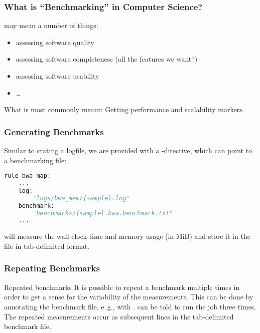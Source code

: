 \begin{frame}
  \frametitle{What is ``Benchmarking'' in Computer Science?}
   may mean a number of things:
  \begin{itemize}[<+->]
   \item assessing software quality
   \item assessing software completeness (all the features we want?)
   \item assessing software usability
   \item \ldots
  \end{itemize}
  \pause
  \begin{docs}
  	What is most commonly meant: Getting performance and scalability markers.
  \end{docs}
\end{frame}

\begin{frame}[fragile]
  \frametitle{Generating Benchmarks}
  Similar to crating a logfile, we are provided with a -directive, which can point to a benchmarking file:
  \begin{lstlisting}[language=Python,style=Python]
rule bwa_map:
    ...
    log:
        "logs/bwa_mem/{sample}.log"
    benchmark:
        "benchmarks/{sample}.bwa.benchmark.txt"
    ...
  \end{lstlisting} 
  \begin{docs}
  	\Snakemake{} will measure the wall clock time and memory usage (in MiB) and store it in the file in tab-delimited format.
  \end{docs}
\end{frame}

\begin{frame}[fragile]
  \frametitle{Repeating Benchmarks}
  \vfill
  \begin{exampleblock}{Repeated benchmarks}
   It is possible to repeat a benchmark multiple times in order to get a sense for the variability of the measurements. This can be done by annotating the benchmark file, e.\,g., with . \Snakemake{} can be told to run the job three times. The repeated measurements occur as subsequent lines in the tab-delimited benchmark file.
  \end{exampleblock}
  \vfill
\end{frame} 

